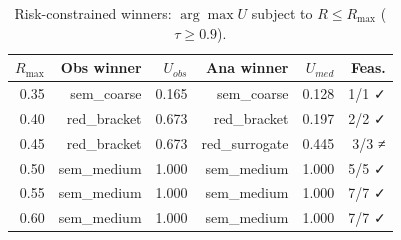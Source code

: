 \begin{table}[t]
\caption{Risk-constrained winners: $\arg\max U$ subject to $R \leq R_{\max}$ ($\tau \geq 0.9$).}
\label{tab:risk-constrained}
\small
\begin{tabular}{@{}rrrrrr@{}}
\toprule
$R_{\max}$ & Obs winner & $U_{obs}$ & Ana winner & $U_{med}$ & Feas. \\
\midrule
0.35 & sem_coarse & 0.165 & sem_coarse & 0.128 & 1/1 ✓ \\
0.40 & red_bracket & 0.673 & red_bracket & 0.197 & 2/2 ✓ \\
0.45 & red_bracket & 0.673 & red_surrogate & 0.445 & 3/3 ≠ \\
0.50 & sem_medium & 1.000 & sem_medium & 1.000 & 5/5 ✓ \\
0.55 & sem_medium & 1.000 & sem_medium & 1.000 & 7/7 ✓ \\
0.60 & sem_medium & 1.000 & sem_medium & 1.000 & 7/7 ✓ \\
\bottomrule
\end{tabular}
\end{table}
